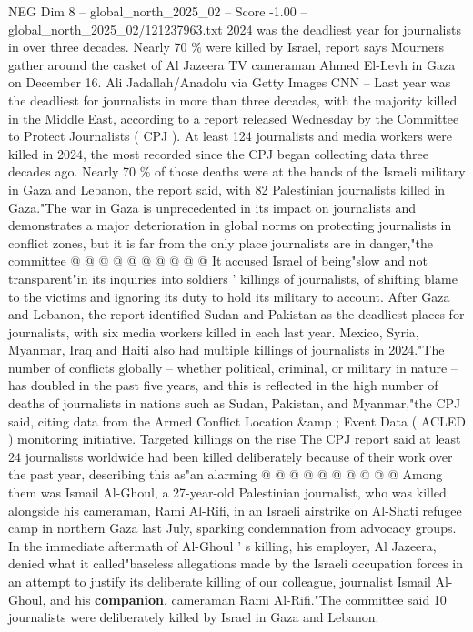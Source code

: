 \begin{textsample}{NEG Dim 8 – global\_north\_2025\_02 – Score -1.00 – global\_north\_2025\_02/121237963.txt}  \label{ex:f8_neg_145}
2024 was the deadliest year for journalists in over three decades.
Nearly 70 \% were killed by Israel, report says Mourners gather around the casket of Al Jazeera TV cameraman Ahmed El-Levh in Gaza on December 16.
Ali Jadallah/Anadolu via Getty Images CNN -- Last year was the deadliest for journalists in more than three decades, with the majority killed in the Middle East, according to a report released Wednesday by the Committee to Protect Journalists ( CPJ ).
At least 124 journalists and media workers were killed in 2024, the most recorded since the CPJ began collecting data three decades ago.
Nearly 70 \% of those deaths were at the hands of the Israeli military in Gaza and Lebanon, the report said, with 82 Palestinian journalists killed in Gaza."The war in Gaza is unprecedented in its impact on journalists and demonstrates a major deterioration in global norms on protecting journalists in conflict zones, but it is far from the only place journalists are in danger,"the committee @ @ @ @ @ @ @ @ @ @ It accused Israel of being"slow and not transparent"in its inquiries into soldiers ' killings of journalists, of shifting blame to the victims and ignoring its duty to hold its military to account.
After Gaza and Lebanon, the report identified Sudan and Pakistan as the deadliest places for journalists, with six media workers killed in each last year.
Mexico, Syria, Myanmar, Iraq and Haiti also had multiple killings of journalists in 2024."The number of conflicts globally -- whether political, criminal, or military in nature -- has doubled in the past five years, and this is reflected in the high number of deaths of journalists in nations such as Sudan, Pakistan, and Myanmar,"the CPJ said, citing data from the Armed Conflict Location \&amp ; Event Data ( ACLED ) monitoring initiative.
Targeted killings on the rise The CPJ report said at least 24 journalists worldwide had been killed deliberately because of their work over the past year, describing this as"an alarming @ @ @ @ @ @ @ @ @ @ Among them was Ismail Al-Ghoul, a 27-year-old Palestinian journalist, who was killed alongside his cameraman, Rami Al-Rifi, in an Israeli airstrike on Al-Shati refugee camp in northern Gaza last July, sparking condemnation from advocacy groups.
In the immediate aftermath of Al-Ghoul ' s killing, his employer, Al Jazeera, denied what it called"baseless allegations made by the Israeli occupation forces in an attempt to justify its deliberate killing of our colleague, journalist Ismail Al-Ghoul, and his \textbf{companion}, cameraman Rami Al-Rifi."The committee said 10 journalists were deliberately killed by Israel in Gaza and Lebanon.

\end{textsample}
